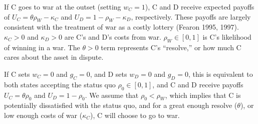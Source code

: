 \documentclass[
]{article}
\begin{document}
If C goes to war at the outset (setting \(w_{C}=1\)), C and D receive expected payoffs of \(U_{C}=\theta\rho_{W}-\kappa_{C}\) and \(U_{D}=1-\rho_{W}-\kappa_{D}\), respectively. These payoffs are largely consistent with the treatment of war as a costly lottery (Fearon 1995, 1997). \(\kappa_{C}>0\) and \(\kappa_{D}>0\) are C's and D's costs from war. \(\rho_{W}\in[0,1]\) is C's likelihood of winning in a war. The \(\theta>0\) term represents C's ``resolve,'' or how much C cares about the asset in dispute.

If C sets \(w_{C}=0\) and \(g_{C}=0\), and D sets \(w_{D}=0\) and \(g_{D}=0\), this is equivalent to both states accepting the status quo \(\rho_{0}\in[0,1]\), and C and D receive payoffs \(U_{C}=\theta\rho_{0}\) and \(U_{D}=1-\rho_{0}\). We assume that \(\rho_{0}<\rho_{W}\), which implies that C is potentially dissatisfied with the status quo, and for a great enough resolve (\(\theta\)), or low enough costs of war (\(\kappa_{C}\)), C will choose to go to war.
\end{document}
